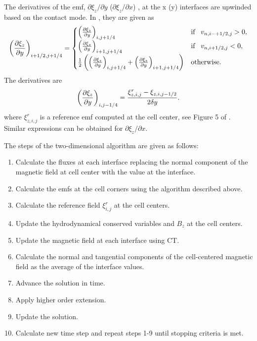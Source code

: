 The derivatives of the emf, $\partial \xi_z / \partial y$ ($\partial \xi_z / \partial x$) , at the x (y) interfaces are upwinded based on the contact mode.  In \citep{Gardiner:2005}, they are given as
\begin{gather}
\label{eqn:emf_upwind}
\left( \frac{\partial \xi_z}{\partial y}\right)_{i+1/2,j+1/4} =
\begin{cases}
\left( \frac{\partial \xi_z}{\partial y}\right)_{i,j+1/4} & \text{if}\;\;\; v_{n,i-+1/2,j} > 0 , \\
\left( \frac{\partial \xi_z}{\partial y}\right)_{i+1,j+1/4} & \text{if}\;\;\; v_{n,i+1/2,j} < 0 , \\
\frac{1}{2}\left(\left( \frac{\partial \xi_z}{\partial y}\right)_{i,j+1/4} + \left( \frac{\partial \xi_z}{\partial y}\right)_{i+1,j+1/4} \right)& \text{otherwise}.
\end{cases}
\end{gather}
The derivatives are 
\begin{gather}
\left( \frac{\partial \xi_z}{\partial y} \right)_{i,j-1/4} = \frac{\xi^r_{z,i,j} - \xi_{z,i,j-1/2}}{2\delta y}.
\end{gather}
where $\xi^r_{z,i,j}$ is a reference emf computed at the cell center, see Figure 5 of \citep{Stone:2008}.  Similar expressions can be obtained for $\partial \xi_z / \partial x$. 

The steps of the two-dimensional algorithm are given as follows:
\begin{enumerate}
\item Calculate the fluxes at each interface replacing the normal component of the magnetic field at cell center with the value at the interface.
\item Calculate the emfs at the cell corners using the algorithm described above.
\item Calculate the reference field $\xi^r_{i,j}$ at the cell centers.
\item Update the hydrodynamical conserved variables and $B_z$ at the cell centers.
\item Update the magnetic field at each interface using CT.
\item Calculate the normal and tangential components of the cell-centered magnetic field as the average of the interface values.
\item Advance the solution in time.
\item Apply higher order extension.
\item Update the solution.
\item Calculate new time step and repeat steps 1-9 until stopping criteria is met.
\end{enumerate}

